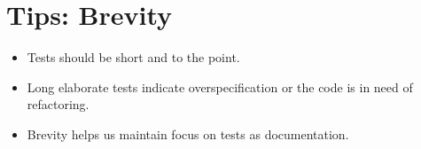 \documentclass{article}
\begin{document}
\sloppy
\section{Tips: Brevity}
\begin{itemize}
    \item Tests should be short and to the point.
    \item Long elaborate tests indicate overspecification or the code is in
        need of refactoring.
    \item Brevity helps us maintain focus on tests as documentation.
\end{itemize}
\end{document}

